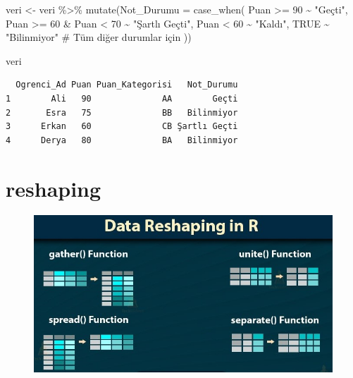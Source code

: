 \documentclass[
  letterpaper,
  DIV=11,
  numbers=noendperiod]{scrreprt}
\newenvironment{Shaded}{\begin{snugshade}}{\end{snugshade}}
\newcommand{\AttributeTok}[1]{\textcolor[rgb]{0.40,0.45,0.13}{#1}}
\newcommand{\CommentTok}[1]{\textcolor[rgb]{0.37,0.37,0.37}{#1}}
\newcommand{\ConstantTok}[1]{\textcolor[rgb]{0.56,0.35,0.01}{#1}}
\newcommand{\DecValTok}[1]{\textcolor[rgb]{0.68,0.00,0.00}{#1}}
\newcommand{\FunctionTok}[1]{\textcolor[rgb]{0.28,0.35,0.67}{#1}}
\newcommand{\NormalTok}[1]{\textcolor[rgb]{0.00,0.23,0.31}{#1}}
\newcommand{\OtherTok}[1]{\textcolor[rgb]{0.00,0.23,0.31}{#1}}
\newcommand{\SpecialCharTok}[1]{\textcolor[rgb]{0.37,0.37,0.37}{#1}}
\newcommand{\StringTok}[1]{\textcolor[rgb]{0.13,0.47,0.30}{#1}}
\begin{document}
\begin{Shaded}
\begin{Highlighting}[]
\NormalTok{veri }\OtherTok{\textless{}{-}}\NormalTok{ veri }\SpecialCharTok{\%\textgreater{}\%}
  \FunctionTok{mutate}\NormalTok{(}\AttributeTok{Not\_Durumu =} \FunctionTok{case\_when}\NormalTok{(}
\NormalTok{    Puan }\SpecialCharTok{\textgreater{}=} \DecValTok{90} \SpecialCharTok{\textasciitilde{}} \StringTok{"Geçti"}\NormalTok{,}
\NormalTok{    Puan }\SpecialCharTok{\textgreater{}=} \DecValTok{60} \SpecialCharTok{\&}\NormalTok{ Puan }\SpecialCharTok{\textless{}} \DecValTok{70} \SpecialCharTok{\textasciitilde{}} \StringTok{"Şartlı Geçti"}\NormalTok{,}
\NormalTok{    Puan }\SpecialCharTok{\textless{}} \DecValTok{60} \SpecialCharTok{\textasciitilde{}} \StringTok{"Kaldı"}\NormalTok{,}
    \ConstantTok{TRUE} \SpecialCharTok{\textasciitilde{}} \StringTok{"Bilinmiyor"}  \CommentTok{\# Tüm diğer durumlar için}
\NormalTok{  ))}

\NormalTok{veri}
\end{Highlighting}
\end{Shaded}

\begin{verbatim}
  Ogrenci_Ad Puan Puan_Kategorisi   Not_Durumu
1        Ali   90              AA        Geçti
2       Esra   75              BB   Bilinmiyor
3      Erkan   60              CB Şartlı Geçti
4      Derya   80              BA   Bilinmiyor
\end{verbatim}

\hypertarget{reshaping}{%
\section*{reshaping}\label{reshaping}}


\begin{figure}

{\centering \includegraphics{images/reshape.jpg}

}

\end{figure}
\end{document}
